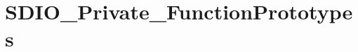 \hypertarget{group___s_d_i_o___private___function_prototypes}{\section{S\-D\-I\-O\-\_\-\-Private\-\_\-\-Function\-Prototypes}
\label{group___s_d_i_o___private___function_prototypes}
}
